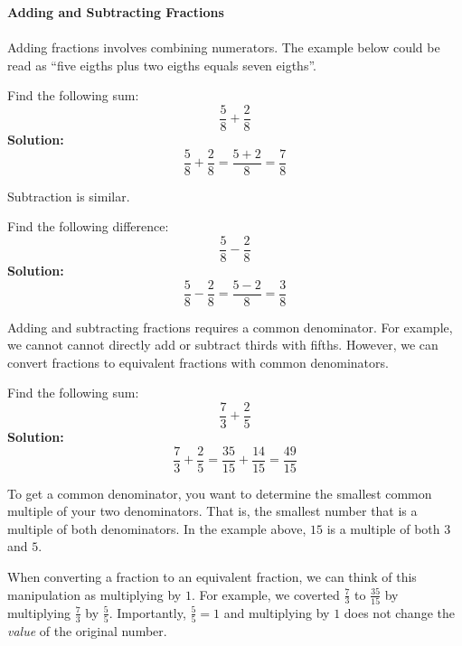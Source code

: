 \newpage 
\textbf{Adding and Subtracting Fractions}
\\ \\
Adding fractions involves combining numerators.   The example below could be read as ``five eigths plus two eigths equals seven eigths''.  
\begin{example}
	Find the following sum:
	\[\frac{5}{8}+\frac{2}{8}\]
\textbf{Solution:}
	\[\frac{5}{8}+\frac{2}{8} = \frac{5+2}{8} =  \frac{7}{8}\]
\end{example}
\vspace{3mm}
Subtraction is similar. 
\begin{example}
	Find the following difference:
	\[\frac{5}{8}-\frac{2}{8}\]
\textbf{Solution:}
	\[\frac{5}{8}-\frac{2}{8} = \frac{5-2}{8} = \frac{3}{8}\]
\end{example}
\vspace{3mm}
Adding and subtracting fractions requires a common denominator.  For example, we cannot cannot directly add or subtract thirds with fifths.  However, we can convert fractions to equivalent fractions with common denominators.  
\begin{example}
	Find the following sum: 
	\[\frac{7}{3} + \frac{2}{5}\]
\textbf{Solution:}
	\[\frac{7}{3} + \frac{2}{5} = \frac{35}{15} + \frac{14}{15} = \frac{49}{15} \]
\end{example}
To get a common denominator, you want to determine the smallest common multiple of your two denominators.  That is, the smallest number that is a multiple of both denominators.  In the example above, \(15\) is a multiple of both \(3\) and \(5\).  
\begin{remark}
 	When converting a fraction to an equivalent fraction, we can think of this manipulation as multiplying by \(1\).  For example, we coverted \(\frac{7}{3}\) to \(\frac{35}{15}\) by multiplying \(\frac{7}{3}\) by \(\frac{5}{5}\).  Importantly, \(\frac{5}{5} = 1\)  and multiplying by \(1\) does not change the \emph{value} of the original number. 
\end{remark}



\newpage 


